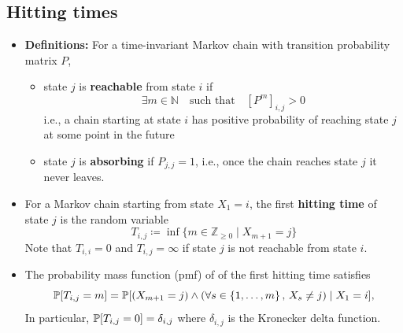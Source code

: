 \documentclass[11pt,twoside]{report}
\newcommand{\bbN}{{\mathbb{N}}}
\newcommand{\bbZ}{{\mathbb{Z}}}
\begin{document}

\subsection{Hitting times} 

\begin{itemize}

\item \textbf{Definitions:} For a time-invariant Markov chain with transition probability matrix $P$, 
\begin{itemize}
\item state $j$ is \textbf{reachable} from state $i$ if  %
\[
\exists m \in \bbN \quad \text{such that} \quad [P^m]_{i,j}  >0
\]
i.e.,  a chain starting at state $i$ has positive probability of reaching state $j$ at some point in the future

\item state $j$ is \textbf{absorbing} if $P_{j,j}  =1$, i.e., once the chain reaches state $j$ it never leaves.
\end{itemize}

\item  For a Markov chain starting from state $X_1 = i$, the first \textbf{hitting time} of state $j$ is the random variable
\[
T_{i,j} \coloneqq \inf\{ m \in \bbZ_{\ge 0} \mid  X_{m+1}=j \} 
\]
Note that $T_{i,i} = 0$ and $T_{i,j} = \infty$ if state $j$ is not reachable from state $i$. 
\item The probability mass function (pmf) of of the first hitting time satisfies
\[
\pr{ T_{i,j}=m} =
 \pr{ ( X_{m+1}=j ) \wedge ( \forall s \in \{ 1, \dots, m\}  \,, \,   X_{s}\ne j )   \mid X_{1}=i } , 
\]
In particular, $\pr{T_{i,j} = 0} = \delta_{i,j}$ where $\delta_{i,j}$ is the Kronecker delta function. 



\end{itemize}
\end{document}
